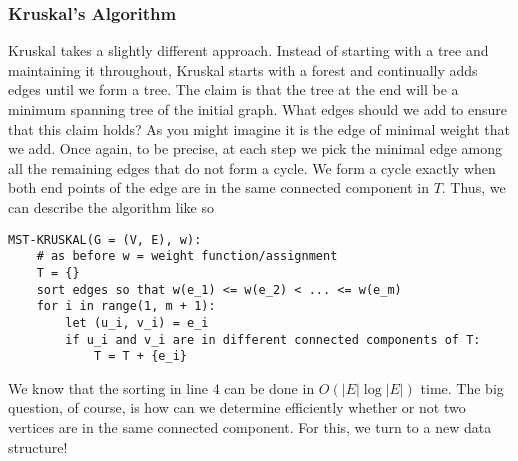 \subsubsection{Kruskal's Algorithm}
Kruskal takes a slightly different approach. Instead of starting with a tree and maintaining it throughout, Kruskal starts with a forest and continually adds edges until we form a tree. The claim is that the tree at the end will be a minimum spanning tree of the initial graph. What edges should we add to ensure that this claim holds? As you might imagine it is the edge of minimal weight that we add. Once again, to be precise, at each step we pick the minimal edge among all the remaining edges that do not form a cycle. We form a cycle exactly when both end points of the edge are in the same connected component in $T$. Thus, we can describe the algorithm like so
\begin{lstlisting}
MST-KRUSKAL(G = (V, E), w):
    # as before w = weight function/assignment
    T = {}
    sort edges so that w(e_1) <= w(e_2) < ... <= w(e_m)
    for i in range(1, m + 1):
        let (u_i, v_i) = e_i
        if u_i and v_i are in different connected components of T:
            T = T + {e_i}
\end{lstlisting}

We know that the sorting in line 4 can be done in $O(\left|E\right| \log \left|E\right|)$ time. The big question, of course, is how can we determine efficiently whether or not two vertices are in the same connected component. For this, we turn to a new data structure!